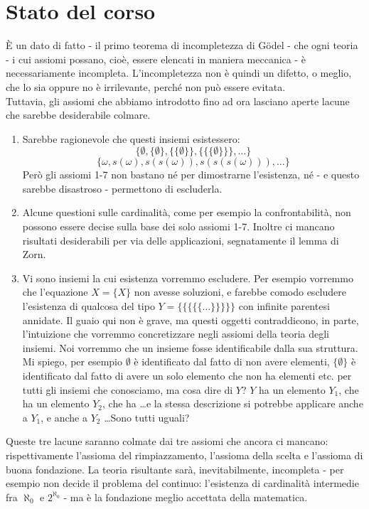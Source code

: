 \documentclass[11pt]{scrartcl}
\begin{document}
\section*{Stato del corso}
È un dato di fatto - il primo teorema di incompletezza di Gödel - che ogni teoria  - i cui assiomi possano, cioè, essere elencati 
in maniera meccanica - è necessariamente incompleta. L'incompletezza non è quindi un difetto, o meglio, che lo sia oppure no è irrilevante, perché 
non può essere evitata.\\
Tuttavia, gli assiomi che abbiamo introdotto fino ad ora lasciano aperte lacune che sarebbe desiderabile colmare.

\begin{enumerate}[1.]
	\item Sarebbe ragionevole che questi insiemi esistessero:
	\[ \{\emptyset, \{\emptyset\}, \{\{\emptyset\}\}, \{\{\{\emptyset\}\}\}, \ldots\}
		\]\[ \{\omega, s(\omega), s(s(\omega)), s(s(s(\omega))),\ldots\}
			\]
	Però gli assiomi 1-7 non bastano né per dimostrarne l'esistenza, né - e questo sarebbe disastroso - permettono di escluderla.
	\item Alcune questioni sulle cardinalità, come per esempio la confrontabilità, non possono essere decise sulla base dei solo assiomi 1-7.
	Inoltre ci mancano risultati desiderabili per via delle applicazioni, segnatamente il lemma di Zorn.
	\item Vi sono insiemi la cui esistenza vorremmo escludere. Per esempio vorremmo che l'equazione $X = \{X\}$ non avesse soluzioni, e farebbe comodo escludere 
	l'esistenza di qualcosa del tipo $Y = \{\{\{\{\{\ldots\}\}\}\}\}$ con infinite parentesi annidate. Il guaio qui non è grave, ma questi oggetti contraddicono, in parte, l'intuizione che vorremmo 
	concretizzare negli assiomi della teoria degli insiemi. Noi vorremmo che un insieme fosse identificabile dalla sua struttura. Mi spiego, per esempio $\emptyset$ è identificato dal fatto di non avere elementi,
	$\{\emptyset\}$ è identificato dal fatto di avere un solo elemento che non ha elementi etc. per tutti gli insiemi che conosciamo, ma cosa dire di $Y$? $Y$ ha un elemento $Y_1$, che ha un elemento $Y_2$,
	che ha \ldots e la stessa descrizione si potrebbe applicare anche a $Y_1$, e anche a $Y_2$ \ldots Sono tutti uguali? 
\end{enumerate}

Queste tre lacune saranno colmate dai tre assiomi che ancora ci mancano: rispettivamente l'assioma del rimpiazzamento, l'assioma della scelta e l'assioma di buona fondazione. La teoria risultante sarà,
inevitabilmente, incompleta - per esempio non decide il problema del continuo: l'esistenza di cardinalità intermedie fra $\aleph_0$ e $2^{\aleph_0}$ - ma è la fondazione meglio accettata della matematica.
\end{document}
